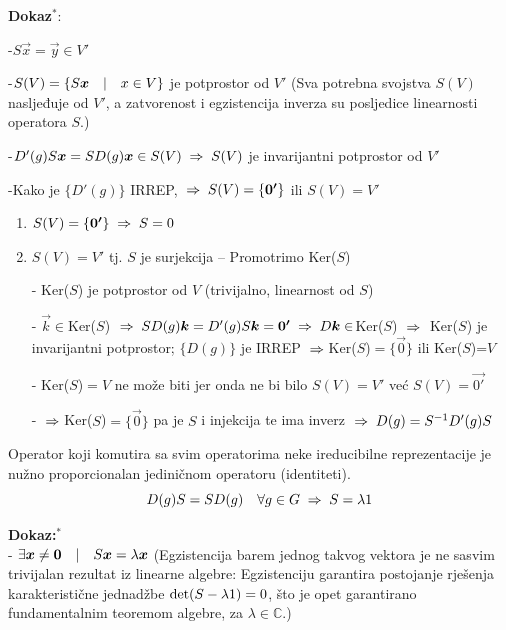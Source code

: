 \textbf{Dokaz}$^{*}$: 

-$S\vec{x}=\vec{y}\in V'$

-$S(V)=\{S\vec{x} \td x \in V \}$ je potprostor od $V'$ (Sva potrebna svojstva
  $S(V)$  nasljeđuje od  $V'$, a zatvorenost i egzistencija inverza su 
 posljedice linearnosti operatora $S$.)


-$D'(g)S\vec{x}=SD(g)\vec{x} \in S(V) \imp  S(V)$ je invarijantni
   potprostor od $V'$

-Kako je $\{D'(g)\}$ IRREP, $\imp S(V)=\{\vec{0'}\}$ ili $S(V)=V'$

\begin{enumerate}[1)]
\item $ S(V)=\{\vec{0'}\} \imp  S=0$

\item $S(V)=V'$ tj. $S$ je surjekcija -- Promotrimo Ker($S$) 

  - Ker($S$) je potprostor od $V$ (trivijalno, linearnost od $S$)

  - $\vec{k}\in$Ker($S$) $\imp S D(g) \vec{k} = D'(g)S\vec{k} =
    \vec{0'} \imp D\vec{k} \in $Ker($S$) $\;\Rightarrow\;$ Ker($S$) je
    invarijantni potprostor; $\{D(g)\}$ je IRREP $\;\Rightarrow\;
    $Ker($S$)$=\{\vec{0}\}$ ili Ker($S$)=$V$

  - Ker($S$)$=V$ ne može biti jer onda ne bi bilo $S(V)=V'$ već
      $S(V)=\vec{0'}$

  - $\;\Rightarrow\; $Ker($S$)$=\{\vec{0}\}$ pa je $S$ i injekcija te ima inverz
    $\;\Rightarrow\; D(g)=S^{-1}D'(g)S$


\end{enumerate}

\begin{teorem}
Operator koji komutira sa svim operatorima neke ireducibilne 
reprezentacije je nužno proporcionalan jediničnom operatoru
(identiteti).
\begin{displaymath}
  D(g)S=SD(g) \quad \forall g\in G \;\Rightarrow\; S = \lambda 1
\end{displaymath}
\end{teorem}

\textbf{Dokaz:}$^{*}$ \\

- $\exists \vec{x}\neq\vec{0} \td S\vec{x}=\lambda\vec{x}$ (Egzistencija barem
  jednog takvog vektora je ne sasvim trivijalan rezultat iz linearne algebre:
  Egzistenciju garantira postojanje rješenja karakteristične
  jednadžbe $\det(S - \lambda 1)=0$, što je opet garantirano fundamentalnim
   teoremom algebre, za $\lambda \in \mathbb{C}$.)

